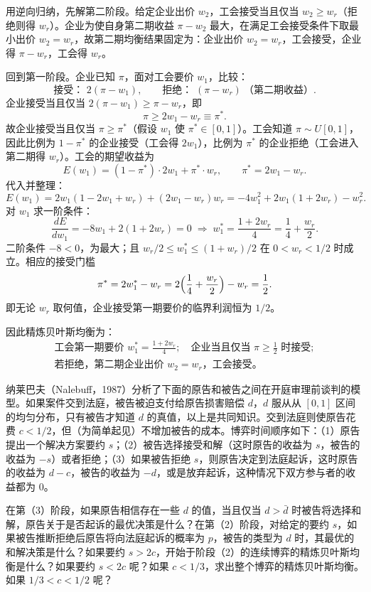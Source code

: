 \sol 用逆向归纳，先解第二阶段。给定企业出价 $w_2$，工会接受当且仅当 $w_2\ge w_r$（拒绝则得 $w_r$）。企业为使自身第二期收益 $\pi-w_2$ 最大，在满足工会接受条件下取最小出价 $w_2=w_r$，故第二期均衡结果固定为：企业出价 $w_2=w_r$，工会接受，企业得 $\pi-w_r$，工会得 $w_r$。

回到第一阶段。企业已知 $\pi$，面对工会要价 $w_1$，比较：
\[
  \text{接受： }2(\pi-w_1),\qquad
  \text{拒绝： }(\pi-w_r)\ \text{（第二期收益）}.
\]\indent
企业接受当且仅当 $2(\pi-w_1)\ge \pi-w_r$，即
\[
  \pi\ge 2w_1-w_r \equiv \pi^* .
\]\indent
故企业接受当且仅当 $\pi\ge \pi^*$（假设 $w_1$ 使 $\pi^*\in[0,1]$）。工会知道 $\pi\sim U[0,1]$，因此比例为 $1-\pi^*$ 的企业接受（工会得 $2w_1$），比例为 $\pi^*$ 的企业拒绝（工会进入第二期得 $w_r$）。工会的期望收益为
\[
  E(w_1)=(1-\pi^*)\cdot 2w_1+\pi^*\cdot w_r,
  \qquad \pi^*=2w_1-w_r.
\]\indent
代入并整理：
\[
  E(w_1)=2w_1(1-2w_1+w_r)+(2w_1-w_r)w_r
        =-4w_1^2+2w_1(1+2w_r)-w_r^2.
\]\indent
对 $w_1$ 求一阶条件：
\[
  \frac{dE}{dw_1}=-8w_1+2(1+2w_r)=0
  \;\Longrightarrow\;
  w_1^*=\frac{1+2w_r}{4}=\frac14+\frac{w_r}{2}.
\]\indent
二阶条件 $-8<0$，为最大；且 $w_r/2\le w_1^*\le(1+w_r)/2$ 在 $0<w_r<1/2$ 时成立。相应的接受门槛
\[
  \pi^*=2w_1^*-w_r=2\Bigl(\frac14+\frac{w_r}{2}\Bigr)-w_r=\frac12.
\]\indent
即无论 $w_r$ 取何值，企业接受第一期要价的临界利润恒为 $1/2$。

因此精炼贝叶斯均衡为：
\[
  \boxed{\;
  \begin{gathered}
  \text{工会第一期要价 }w_1^*=\frac{1+2w_r}{4};\quad
  \text{企业当且仅当 }\pi\ge \tfrac12\text{ 时接受};\\
  \text{若拒绝，第二期企业出价 }w_2=w_r\text{，工会接受。}
  \end{gathered}
  \;}
\]

纳莱巴夫（Nalebuff，1987）分析了下面的原告和被告之间在开庭审理前谈判的模型。如果案件交到法庭，被告被迫支付给原告损害赔偿 $d$，$d$ 服从从 $[0,1]$ 区间的均匀分布，只有被告才知道 $d$ 的真值，以上是共同知识。交到法庭则使原告花费 $c<1/2$，但（为简单起见）不增加被告的成本。博弈时间顺序如下：（1）原告提出一个解决方案要约 $s$；（2）被告选择接受和解（这时原告的收益为 $s$，被告的收益为 $-s$）或者拒绝；（3）如果被告拒绝 $s$，则原告决定到法庭起诉，这时原告的收益为 $d-c$，被告的收益为 $-d$，或是放弃起诉，这种情况下双方参与者的收益都为 $0$。

在第（3）阶段，如果原告相信存在一些 $d$ 的值，当且仅当 $d>\bar d$ 时被告将选择和解，原告关于是否起诉的最优决策是什么？在第（2）阶段，对给定的要约 $s$，如果被告推断拒绝后原告将向法庭起诉的概率为 $p$，被告的类型为 $d$ 时，其最优的和解决策是什么？如果要约 $s>2c$，开始于阶段（2）的连续博弈的精炼贝叶斯均衡是什么？如果要约 $s<2c$ 呢？如果 $c<1/3$，求出整个博弈的精炼贝叶斯均衡。如果 $1/3<c<1/2$ 呢？

